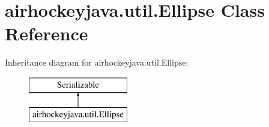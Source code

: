 \hypertarget{classairhockeyjava_1_1util_1_1_ellipse}{}\section{airhockeyjava.\+util.\+Ellipse Class Reference}
\label{classairhockeyjava_1_1util_1_1_ellipse}
Inheritance diagram for airhockeyjava.\+util.\+Ellipse\+:\begin{figure}[H]
\begin{center}
\leavevmode
\includegraphics[height=2.000000cm]{classairhockeyjava_1_1util_1_1_ellipse}
\end{center}
\end{figure}
